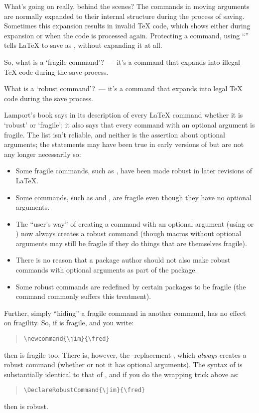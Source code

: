 What's going on really, behind the scenes? The commands in moving
arguments are normally expanded to their internal structure during the
process of saving. Sometimes this expansion results in invalid \TeX{}
code, which shows either during expansion or when the code is
processed again. Protecting a command, using
``'' tells \LaTeX{} to save  as
, without expanding it at all.

So, what is a `fragile command'?~--- it's a command that expands into
illegal \TeX{} code during the save process.

What is a `robust command'?~--- it's a command that expands into legal
\TeX{} code during the save process.

Lamport's book says in its description of every LaTeX command whether
it is `robust' or `fragile'; it also says that every command with an
optional argument is fragile.  The list isn't reliable, and neither
is the assertion about optional arguments; the statements may have
been true in early versions of \LaTeXe{} but are not any longer
necessarily so:
\begin{itemize}
\item Some fragile commands, such as , have been made robust
  in later revisions of \LaTeX{}.
\item Some commands, such as  and , are fragile
  even though they have no optional arguments.
\item The ``user's way'' of creating a command with an optional
  argument (using  or ) now always
  creates a robust command (though macros without optional arguments
  may still be fragile if they do things that are themselves fragile).
\item There is no reason that a package author should not also make
  robust commands with optional arguments as part of the package.
\item Some robust commands are redefined by certain packages to be
  fragile (the  command commonly suffers this treatment).
\end{itemize}
Further, simply ``hiding'' a fragile command in another command, has
no effect on fragility.  So, if  is fragile, and you write:
\begin{quote}
\begin{verbatim}
\newcommand{\jim}{\fred}
\end{verbatim}
\end{quote}
then  is fragile too.  There is, however, the
-replacement , which
\emph{always} creates a robust command (whether or not it has optional
arguments).  The syntax of  is substantially
identical to that of , and if you do the wrapping
trick above as:
\begin{quote}
\begin{verbatim}
\DeclareRobustCommand{\jim}{\fred}
\end{verbatim}
\end{quote}
then  is robust.

